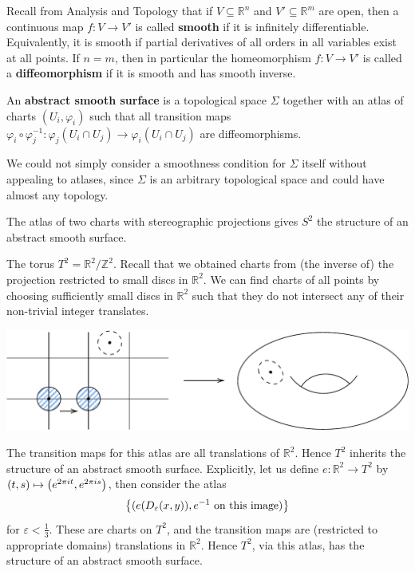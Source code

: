 \documentclass[a4paper,11pt]{article}
\begin{document}
Recall from Analysis and Topology that if \( V \subseteq \mathbb R^n \) and \( V' \subseteq \mathbb R^m \) are open, then a continuous map \( f \colon V \to V' \) is called \textbf{smooth} if it is infinitely differentiable.
Equivalently, it is smooth if partial derivatives of all orders in all variables exist at all points.
If \( n = m \), then in particular the homeomorphism \( f \colon V \to V' \) is called a \textbf{diffeomorphism} if it is smooth and has smooth inverse.

\begin{definition}
	An \textbf{abstract smooth surface} is a topological space \( \Sigma \) together with an atlas of charts \( (U_i, \varphi_i) \) such that all transition maps \( \varphi_i \circ \varphi_j^{-1} \colon \varphi_j(U_i \cap U_j) \to \varphi_i(U_i \cap U_j) \) are diffeomorphisms.
\end{definition}

\begin{remark}
	We could not simply consider a smoothness condition for \( \Sigma \) itself without appealing to atlases, since \( \Sigma \) is an arbitrary topological space and could have almost any topology.
\end{remark}

\begin{example}
	The atlas of two charts with stereographic projections gives \( S^2 \) the structure of an abstract smooth surface.
\end{example}

\begin{example}
	The torus \( T^2 = {\mathbb R^2}/{\mathbb Z^2} \). Recall that we obtained charts from (the inverse of) the projection restricted to small discs in $ \mathbb{R}^{2} $. We can find charts of all points by choosing sufficiently small discs in \( \mathbb R^2 \) such that they do not intersect any of their non-trivial integer translates.

	\begin{center}
	\includegraphics[scale=0.65]{TorusChart1}
	\end{center}

	The transition maps for this atlas are all translations of \( \mathbb R^2 \).
	Hence \( T^2 \) inherits the structure of an abstract smooth surface.
	Explicitly, let us define \( e \colon \mathbb R^2 \to T^2 \) by \( (t,s) \mapsto \qty(e^{2\pi i t}, e^{2 \pi i s}) \), then consider the atlas
	\[
		\qty{(e\qty(D_\varepsilon(x,y)), e^{-1} \text{ on this image})}
	\]
	for \( \varepsilon < \frac{1}{3} \).
	These are charts on \( T^2 \), and the transition maps are (restricted to appropriate domains) translations in \( \mathbb R^2 \).
	Hence \( T^2 \), via this atlas, has the structure of an abstract smooth surface.
\end{example}
\end{document}
